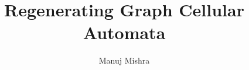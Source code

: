 \documentclass[a4paper, twoside]{report}
\title{Regenerating Graph Cellular Automata}
\author{Manuj Mishra}
\begin{document}




\tableofcontents
\listoffigures
\listofalgorithms









\end{document}
